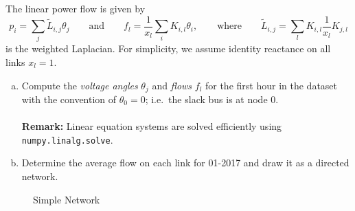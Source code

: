 \documentclass[11pt,a4paper,fleqn]{scrartcl}
\begin{document}
The linear power flow is given by
\begin{equation}
 p_i = \sum_j \tilde{L}_{i,j}\theta_j \qquad \text{and} \qquad f_l = \frac{1}{x_l} \sum_i K_{i,l}\theta_i, \qquad \text{where} \qquad \tilde{L}_{i,j}= \sum_l K_{i,l}\frac{1}{x_l} K_{j,l}
\end{equation}
is the weighted Laplacian. For simplicity, we assume identity reactance on all links $x_l = 1$.

\begin{enumerate}[(a)]
 \item Compute the \textit{voltage angles }$\theta_j$ and \textit{flows} $f_l$ for the first hour in the dataset with the convention of $\theta_0 = 0$; i.e.\ the slack bus is at node 0.\\~\\
       \textbf{Remark:} Linear equation systems are solved efficiently using \texttt{numpy.linalg.solve}.
 \item Determine the average flow on each link for 01-2017 and draw it as a directed network.

\end{enumerate}

\begin{figure}[h]
 \centering
 \caption{Simple Network}
 \label{fig:network2}
\end{figure}

%
%
\end{document}
